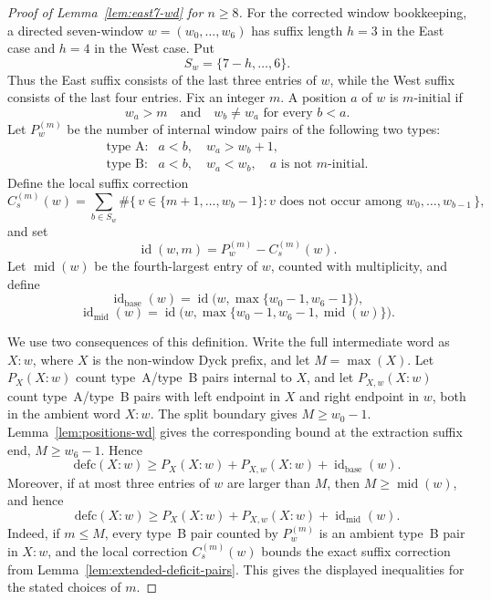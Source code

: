 \documentclass[11pt]{article}
\theoremstyle{plain}
\theoremstyle{definition}
\theoremstyle{remark}
\newcommand{\defc}{\mathrm{defc}}
\begin{document}
\begin{proof}[Proof of Lemma~\ref{lem:east7-wd} for \(n\ge 8\)]
For the corrected window bookkeeping, a directed seven-window
\(w=(w_0,\ldots,w_6)\) has suffix length \(h=3\) in the East case and \(h=4\)
in the West case.  Put
\[
  S_w=\{7-h,\ldots,6\}.
\]
Thus the East suffix consists of the last three entries of \(w\), while the
West suffix consists of the last four entries.  Fix an integer \(m\).  A
position \(a\) of \(w\) is \(m\)-initial if
\[
  w_a>m
  \quad\text{and}\quad
  w_b\ne w_a\text{ for every }b<a.
\]
Let \(P_w^{(m)}\) be the number of internal window pairs of the following two
types:
\[
\begin{array}{ll}
\text{type A:} & a<b,\quad w_a>w_b+1,\\[2mm]
\text{type B:} & a<b,\quad w_a<w_b,\quad a\text{ is not }m\text{-initial}.
\end{array}
\]
Define the local suffix correction
\[
  C_s^{(m)}(w)=
  \sum_{b\in S_w}
  \#\{\,v\in\{m+1,\ldots,w_b-1\}:
       v\text{ does not occur among }w_0,\ldots,w_{b-1}\,\},
\]
and set
\[
  \operatorname{id}(w,m)=P_w^{(m)}-C_s^{(m)}(w).
\]
Let \(\operatorname{mid}(w)\) be the fourth-largest entry of \(w\), counted
with multiplicity, and define
\[
  \operatorname{id}_{\mathrm{base}}(w)
  =
  \operatorname{id}\bigl(w,\max\{w_0-1,w_6-1\}\bigr),
\]
\[
  \operatorname{id}_{\mathrm{mid}}(w)
  =
  \operatorname{id}\bigl(w,\max\{w_0-1,w_6-1,\operatorname{mid}(w)\}\bigr).
\]

We use two consequences of this definition.  Write the full intermediate word
as \(X:w\), where \(X\) is the non-window Dyck prefix, and let \(M=\max(X)\).
Let \(P_X(X:w)\) count type~A/type~B pairs internal to \(X\), and let
\(P_{X,w}(X:w)\) count type~A/type~B pairs with left endpoint in \(X\) and
right endpoint in \(w\), both in the ambient word \(X:w\).  The split boundary
gives \(M\ge w_0-1\).  Lemma~\ref{lem:positions-wd} gives the corresponding
bound at the extraction suffix end, \(M\ge w_6-1\).  Hence
\[
  \defc(X:w)
  \ge
  P_X(X:w)+P_{X,w}(X:w)+\operatorname{id}_{\mathrm{base}}(w).
\]
Moreover, if at most three entries of \(w\) are larger than \(M\), then
\(M\ge\operatorname{mid}(w)\), and hence
\[
  \defc(X:w)
  \ge
  P_X(X:w)+P_{X,w}(X:w)+\operatorname{id}_{\mathrm{mid}}(w).
\]
Indeed, if \(m\le M\), every type~B pair counted by \(P_w^{(m)}\) is an
ambient type~B pair in \(X:w\), and the local correction
\(C_s^{(m)}(w)\) bounds the exact suffix correction from
Lemma~\ref{lem:extended-deficit-pairs}.  This gives the displayed inequalities
for the stated choices of \(m\).


\end{proof}
\end{document}
